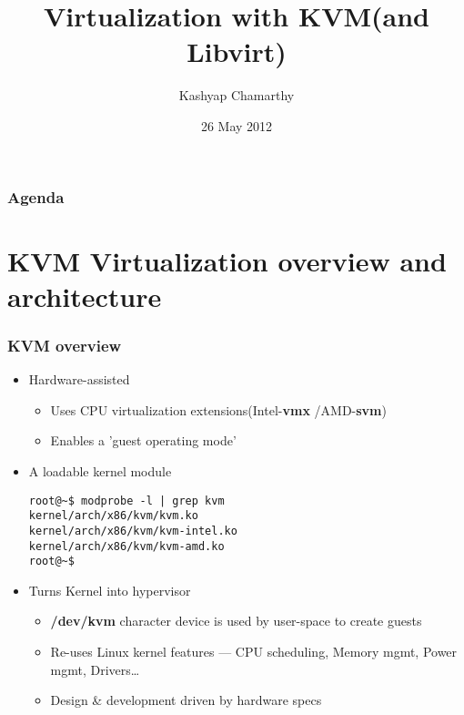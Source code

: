 \documentclass[pdfte x,unicode,minimal,xcolor=table]{beamer}
\title{Virtualization with KVM(and Libvirt)}
\institute{Red Hat}
\author{Kashyap Chamarthy}
\date{26 May 2012}
\begin{document}
\begin{rhbg}
\begin{frame}
    \titlepage

\end{frame}
\end{rhbg}


 {
    \begin{frame}
    \frametitle{Agenda}
    \tableofcontents
    \end{frame}
}

\section{KVM Virtualization overview and architecture}


\begin{frame}[fragile]
    \frametitle{KVM overview}
    \begin{itemize}
	\item Hardware-assisted 
        \begin{itemize}
        \item Uses CPU virtualization extensions(Intel-\textbf{vmx} /AMD-\textbf{svm})
        \item Enables a 'guest operating mode'
        \end{itemize}
    \item A loadable kernel module
    \begin{center}
    \begin{verbatim}
root@~$ modprobe -l | grep kvm
kernel/arch/x86/kvm/kvm.ko
kernel/arch/x86/kvm/kvm-intel.ko
kernel/arch/x86/kvm/kvm-amd.ko
root@~$ 
    \end{verbatim}
    \end{center}
 	\item Turns Kernel into hypervisor  
        \begin{itemize} %
        \item \textbf{ /dev/kvm } character device is used by user-space to create guests
        \item Re-uses Linux kernel features --- CPU scheduling, Memory mgmt, Power mgmt,
        Drivers\ldots
        \item Design \& development driven by hardware specs
       \end{itemize} 
    \end{itemize}
\end{frame}
\end{document}

